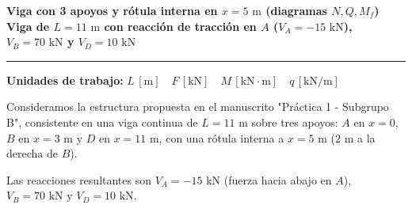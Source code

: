 \begin{tcolorbox}[colback=blue!3!white, colframe=blue!40!black, arc=3pt, boxrule=0.8pt, left=8pt, right=8pt, top=6pt, bottom=6pt]

    \centering

    {\Large\bfseries\color{blue!60!black} Viga con 3 apoyos y rótula interna en $x=5\text{ m}$ (diagramas $N, Q, M_f$)}\\[2pt]

    {\normalsize\bfseries Viga de $L = 11\text{ m}$ con reacción de tracción en $A$ ($V_A = -15\text{ kN}$), $V_B = 70\text{ kN}$ y $V_D = 10\text{ kN}$}



    \vspace{4pt}\hrule\vspace{4pt}

    {\small\textbf{Unidades de trabajo:} $L\,[\text{m}] \quad F\,[\text{kN}] \quad M\,[\text{kN}\cdot\text{m}] \quad q\,[\text{kN/m}]$}

\end{tcolorbox}






Consideramos la estructura propuesta en el manuscrito "Práctica 1 - Subgrupo B", consistente en una viga continua de $L = 11\text{ m}$ sobre tres apoyos: $A$ en $x=0$, $B$ en $x=3\text{ m}$ y $D$ en $x=11\text{ m}$, con una rótula interna a $x = 5\text{ m}$ ($2\text{ m}$ a la derecha de $B$).

Las reacciones resultantes son $V_A = -15\text{ kN}$ (fuerza hacia abajo en $A$), $V_B = 70\text{ kN}$ y $V_D = 10\text{ kN}$.



